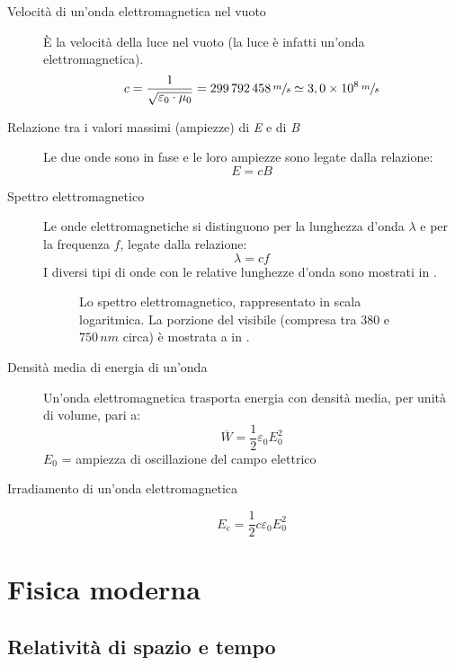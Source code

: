 \documentclass[a4paper,11pt,italian]{article}
\begin{document}
\begin{description}
  \item[Velocità di un'onda elettromagnetica nel vuoto] 
  È la velocità della luce nel vuoto (la luce è infatti un'onda elettromagnetica).
  \[ c = \frac{1}{\sqrt{\varepsilon_0\cdot \mu_0}} =299\,  792\, 458\,	\sfrac{m}{s} \simeq 3,0 \times 10^8 \,	\sfrac{m}{s} \]
  
  \item[Relazione tra i valori massimi (ampiezze) di \textit{E} e di \textit{B}] Le due onde sono in fase e le loro ampiezze sono legate dalla relazione:
  \[ E = cB \]
  
  \item[Spettro elettromagnetico] 
  Le onde elettromagnetiche si distinguono per la lunghezza d'onda $ \lambda $ e per la frequenza $ f $, legate dalla relazione:
  \[ \lambda = c f \]
  I diversi tipi di onde con le relative lunghezze d'onda sono mostrati in .

\begin{figure}[htp]\centering
\begin{tikzpicture}[fill between/on layer={axis grid}]

\end{tikzpicture}
\caption{Lo spettro elettromagnetico, rappresentato in scala logaritmica. La porzione del visibile (compresa tra $ 380 $ e $ 750 \, nm $ circa) è mostrata a  in .}
\label{img:spettroelettromagnetico}
\end{figure}
  
  \item[Densità media di energia di un'onda] 
  Un'onda elettromagnetica trasporta energia con densità media, per unità di volume, pari a: 
  \[ \overline{W} = \frac{1}{2} \varepsilon_0 E_0^2 \]
  $ E_0 $ = ampiezza di oscillazione del campo elettrico
  
  \item[Irradiamento di un'onda elettromagnetica]
  \[ E_e = \frac{1}{2} c \varepsilon_0 E_0^2 \]
\end{description}


\newpage
\section{Fisica moderna}

\subsection{Relatività di spazio e tempo}
\end{document}
